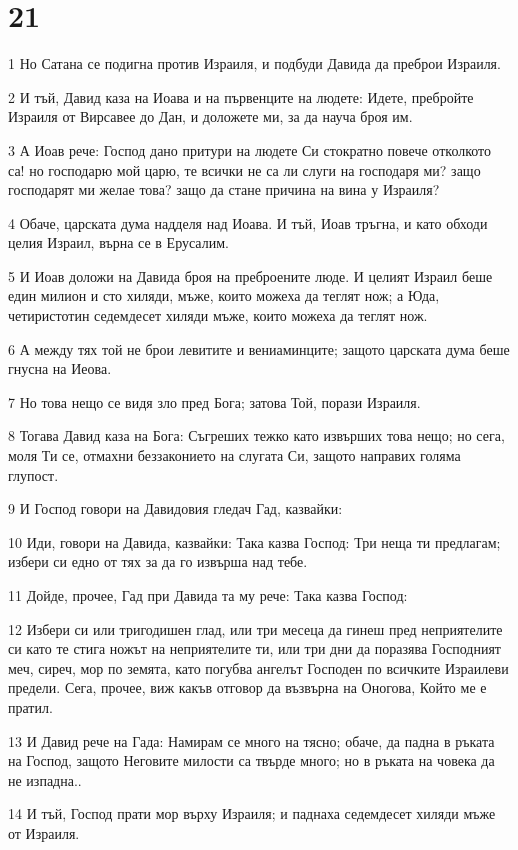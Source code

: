 \chapter{21}

\par 1 Но Сатана се подигна против Израиля, и подбуди Давида да преброи Израиля.
\par 2 И тъй, Давид каза на Иоава и на първенците на людете: Идете, пребройте Израиля от Вирсавее до Дан, и доложете ми, за да науча броя им.
\par 3 А Иоав рече: Господ дано притури на людете Си стократно повече отколкото са! но господарю мой царю, те всички не са ли слуги на господаря ми? защо господарят ми желае това? защо да стане причина на вина у Израиля?
\par 4 Обаче, царската дума надделя над Иоава. И тъй, Иоав тръгна, и като обходи целия Израил, върна се в Ерусалим.
\par 5 И Иоав доложи на Давида броя на преброените люде. И целият Израил беше един милион и сто хиляди, мъже, които можеха да теглят нож; а Юда, четиристотин седемдесет хиляди мъже, които можеха да теглят нож.
\par 6 А между тях той не брои левитите и вениаминците; защото царската дума беше гнусна на Иеова.
\par 7 Но това нещо се видя зло пред Бога; затова Той, порази Израиля.
\par 8 Тогава Давид каза на Бога: Съгреших тежко като извърших това нещо; но сега, моля Ти се, отмахни беззаконието на слугата Си, защото направих голяма глупост.
\par 9 И Господ говори на Давидовия гледач Гад, казвайки:
\par 10 Иди, говори на Давида, казвайки: Така казва Господ: Три неща ти предлагам; избери си едно от тях за да го извърша над тебе.
\par 11 Дойде, прочее, Гад при Давида та му рече: Така казва Господ:
\par 12 Избери си или тригодишен глад, или три месеца да гинеш пред неприятелите си като те стига ножът на неприятелите ти, или три дни да поразява Господният меч, сиреч, мор по земята, като погубва ангелът Господен по всичките Израилеви предели. Сега, прочее, виж какъв отговор да възвърна на Оногова, Който ме е пратил.
\par 13 И Давид рече на Гада: Намирам се много на тясно; обаче, да падна в ръката на Господ, защото Неговите милости са твърде много; но в ръката на човека да не изпадна..
\par 14 И тъй, Господ прати мор върху Израиля; и паднаха седемдесет хиляди мъже от Израиля.
